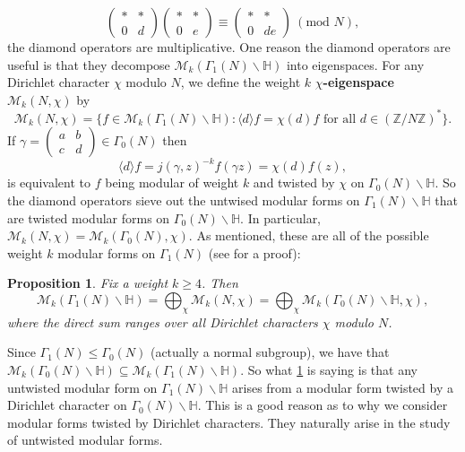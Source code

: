 \documentclass[12pt]{book}
\newtheorem{proposition}{Proposition}[section]
\theoremstyle{definition}\newframedtheorem{method}{Method}
\newcommand{\tmod}[1]{\ \left(\text{mod }#1\right)}
\newcommand{\mc}{\mathcal}
\newcommand{\Z}{\mathbb{Z}}
\renewcommand{\H}{\mathbb{H}}
\newcommand{\g}{\gamma}
\newcommand{\G}{\Gamma}
\newcommand{\bigop}{\bigoplus}
\newcommand{\<}{\langle}
\renewcommand{\>}{\rangle}
\begin{document}
      \[
        \begin{pmatrix} \ast & \ast \\ 0 & d \end{pmatrix}\begin{pmatrix} \ast & \ast \\ 0 & e \end{pmatrix} \equiv \begin{pmatrix} \ast & \ast \\ 0 & de \end{pmatrix} \tmod{N},
      \]
      the diamond operators are multiplicative. One reason the diamond operators are useful is that they decompose $\mc{M}_{k}(\G_{1}(N)\backslash\H)$ into eigenspaces. For any Dirichlet character $\chi$ modulo $N$, we define the weight $k$ \textbf{$\chi$-eigenspace} $\mc{M}_{k}(N,\chi)$ by
      \[
        \mc{M}_{k}(N,\chi) = \{f \in \mc{M}_{k}(\G_{1}(N)\backslash\H):\<d\>f = \chi(d)f \text{ for all } d \in (\Z/N\Z)^{\ast}\}.
      \]
      If $\g = \begin{pmatrix} a & b \\ c & d \end{pmatrix} \in \G_{0}(N)$ then
      \[
        \<d\>f = j(\g,z)^{-k}f(\g z) = \chi(d)f(z),
      \]
      is equivalent to $f$ being modular of weight $k$ and twisted by $\chi$ on $\G_{0}(N)\backslash\H$. So the diamond operators sieve out the untwised modular forms on $\G_{1}(N)\backslash\H$ that are twisted modular forms on $\G_{0}(N)\backslash\H$. In particular, $\mc{M}_{k}(N,\chi) = \mc{M}_{k}(\G_{0}(N),\chi)$. As mentioned, these are all of the possible weight $k$ modular forms on $\G_{1}(N)$ (see \cite{diamond2005first} for a proof):

      \begin{proposition}\label{thm:diamond_operator_decomposition}
        Fix a weight $k \ge 4$. Then
        \[
          \mc{M}_{k}(\G_{1}(N)\backslash\H) = \bigop_{\chi}\mc{M}_{k}(N,\chi) = \bigop_{\chi}\mc{M}_{k}(\G_{0}(N)\backslash\H,\chi),
        \]
          where the direct sum ranges over all Dirichlet characters $\chi$ modulo $N$.
      \end{proposition}

      Since $\G_{1}(N) \le \G_{0}(N)$ (actually a normal subgroup), we have that $\mc{M}_{k}(\G_{0}(N)\backslash\H) \subseteq \mc{M}_{k}(\G_{1}(N)\backslash\H)$. So what \cref{thm:diamond_operator_decomposition} is saying is that any untwisted modular form on $\G_{1}(N)\backslash\H$ arises from a modular form twisted by a Dirichlet character on $\G_{0}(N)\backslash\H$. This is a good reason as to why we consider modular forms twisted by Dirichlet characters. They naturally arise in the study of untwisted modular forms.
\end{document}
